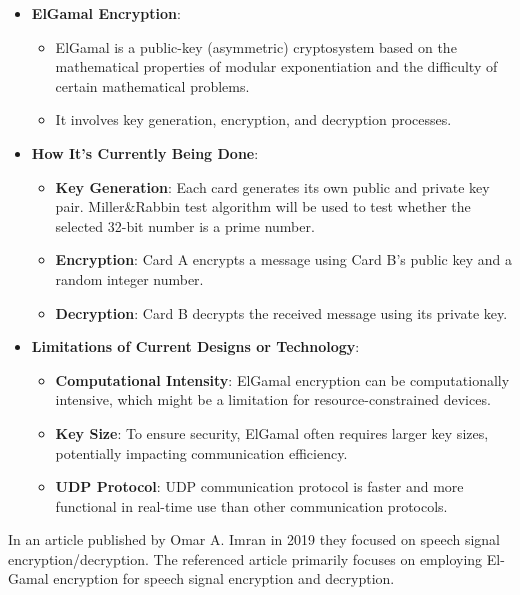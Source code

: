 \documentclass[12pt]{article}
\begin{document}
	\begin{itemize}
		\item \textbf{ElGamal Encryption}:
		\begin{itemize}
			\item ElGamal is a public-key (asymmetric) cryptosystem based on the mathematical properties of modular exponentiation and the difficulty of certain mathematical problems.\cite{book}  \cite{iceis04}
			\item It involves key generation, encryption, and decryption processes.
		\end{itemize}
		
		\item \textbf{How It's Currently Being Done}:
		\begin{itemize}
			\item \textbf{Key Generation}: Each card generates its own public and private key pair.  Miller\&Rabbin test algorithm will be used to test whether the selected 32-bit number is a prime number. \cite{article_369778}
			\item \textbf{Encryption}: Card A encrypts a message using Card B's public key and a random integer number.
			\item \textbf{Decryption}: Card B decrypts the received message using its private key.
		\end{itemize}
		
		\item \textbf{Limitations of Current Designs or Technology}:
		\begin{itemize}
			\item \textbf{Computational Intensity}: ElGamal encryption can be computationally intensive, which might be a limitation for resource-constrained devices.
			\item \textbf{Key Size}: To ensure security, ElGamal often requires larger key sizes, potentially impacting communication efficiency.
			\item \textbf{UDP Protocol}: UDP communication protocol is faster and more functional in real-time use than other communication protocols. \cite{al2018performance}
		\end{itemize}
	\end{itemize}
	
	
	In an article published by Omar A. Imran in 2019\cite{IMRAN20201028} they focused on speech signal encryption/decryption.	The referenced article primarily focuses on employing El-Gamal encryption for speech signal encryption and decryption. 
	
\end{document}
